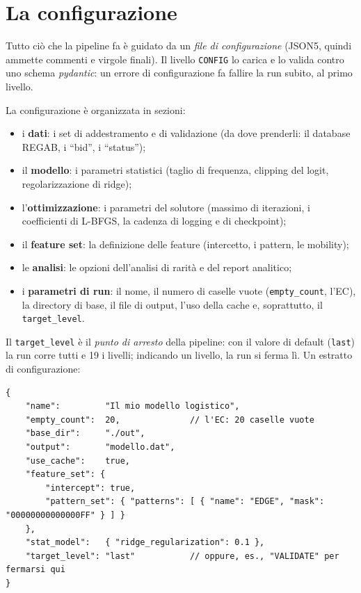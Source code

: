 \section{La configurazione}

Tutto ciò che la pipeline fa è guidato da un \emph{file di configurazione}
(JSON5, quindi ammette commenti e virgole finali). Il livello \texttt{CONFIG} lo
carica e lo valida contro uno schema \emph{pydantic}: un errore di
configurazione fa fallire la run subito, al primo livello.

La configurazione è organizzata in sezioni:
\begin{itemize}
  \item i \textbf{dati}: i set di addestramento e di validazione (da dove
    prenderli: il database REGAB, i ``bid'', i ``status'');
  \item il \textbf{modello}: i parametri statistici (taglio di frequenza,
    clipping del logit, regolarizzazione di ridge);
  \item l'\textbf{ottimizzazione}: i parametri del solutore (massimo di
    iterazioni, i coefficienti di L-BFGS, la cadenza di logging e di
    checkpoint);
  \item il \textbf{feature set}: la definizione delle feature (intercetto, i
    pattern, le mobility);
  \item le \textbf{analisi}: le opzioni dell'analisi di rarità e del report
    analitico;
  \item i \textbf{parametri di run}: il nome, il numero di caselle vuote
    (\texttt{empty\_count}, l'EC), la directory di base, il file di output,
    l'uso della cache e, soprattutto, il \texttt{target\_level}.
\end{itemize}

Il \texttt{target\_level} è il \emph{punto di arresto} della pipeline: con il
valore di default (\texttt{last}) la run corre tutti e 19 i livelli; indicando un
livello, la run si ferma lì. Un estratto di configurazione:

\begin{lstlisting}[caption={Un file di configurazione (estratto illustrativo).}]
{
    "name":         "Il mio modello logistico",
    "empty_count":  20,              // l'EC: 20 caselle vuote
    "base_dir":     "./out",
    "output":       "modello.dat",
    "use_cache":    true,
    "feature_set": {
        "intercept": true,
        "pattern_set": { "patterns": [ { "name": "EDGE", "mask": "00000000000000FF" } ] }
    },
    "stat_model":   { "ridge_regularization": 0.1 },
    "target_level": "last"           // oppure, es., "VALIDATE" per fermarsi qui
}
\end{lstlisting}

